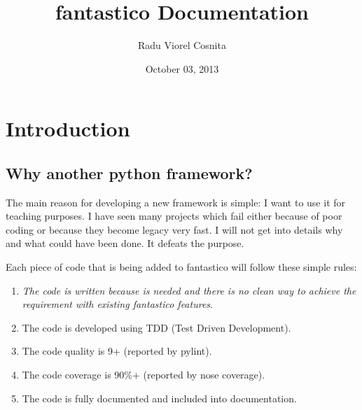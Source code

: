 \documentclass[letterpaper,10pt,english]{sphinxmanual}
\title{fantastico Documentation}
\date{October 03, 2013}
\author{Radu Viorel Cosnita}
\begin{document}
\maketitle
\tableofcontents
{}\label{index::doc}



\chapter{Introduction}
\label{intro:introduction}\label{intro::doc}\label{intro:fantastico-framework}

\section{Why another python framework?}
\label{intro:why-another-python-framework}
The main reason for developing a new framework is simple: I want to use it for teaching purposes. I have seen many projects which
fail either because of poor coding or because they become legacy very fast. I will not get into details why and what could have
been done. It defeats the purpose.

Each piece of code that is being added to fantastico will follow these simple rules:
\begin{enumerate}
\item {} 
\emph{The code is written because is needed and there is no clean way to achieve the requirement with existing fantastico features}.

\item {} 
The code is developed using TDD (Test Driven Development).

\item {} 
The code quality is 9+ (reported by pylint).

\item {} 
The code coverage is 90\%+ (reported by nose coverage).

\item {} 
The code is fully documented and included into documentation.

\end{enumerate}
\end{document}
